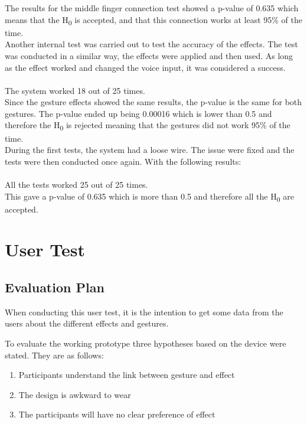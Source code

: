The results for the middle finger connection test showed a p-value of 0.635 which means that the H\textsubscript{0} is accepted, and that this connection works at least 95\% of the time. \\

Another internal test was carried out to test the accuracy of the effects. The test was conducted in a similar way, the effects were applied and then used. 
As long as the effect worked and changed the voice input, it was considered a success. \\\\
The system worked 18 out of 25 times. \\

Since the gesture effects showed the same results, the p-value is the same for both gestures. 
The p-value ended up being 0.00016 which is lower than 0.5 and therefore the H\textsubscript{0} is rejected meaning that the gestures did not work 95\% of the time. \\

During the first tests, the system had a loose wire. The issue were fixed and the tests were then conducted once again. With the following results:\\\\
All the tests worked 25 out of 25 times. \\

This gave a p-value of 0.635 which is more than 0.5 and therefore all the H\textsubscript{0} are accepted.  

\section{User Test}


\subsection{Evaluation Plan}
When conducting this user test, it is the intention to get some data from the users about the different effects and gestures. 

To evaluate the working prototype three hypotheses based on the device were stated. They are as follows:

\begin{enumerate}
\item Participants understand the link between gesture and effect
\item The design is awkward to wear
\item The participants will have no clear preference of effect
\end{enumerate} 


